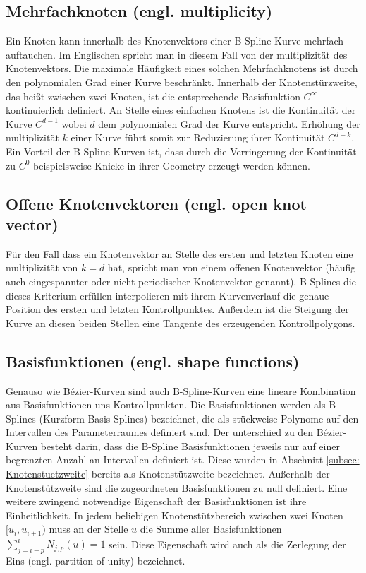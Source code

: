 \documentclass[german,a4paper,12pt,oneside]{scrbook}
\theoremstyle{definition}
\theoremstyle{definition}
\theoremstyle{definition}
\theoremstyle{definition}
\theoremstyle{definition}
\theoremstyle{definition}
\begin{document}
\subsection{Mehrfachknoten (engl. multiplicity)}
Ein Knoten kann innerhalb des Knotenvektors einer B-Spline-Kurve mehrfach auftauchen. Im Englischen spricht man in diesem Fall von der multiplizität des Knotenvektors. Die maximale Häufigkeit eines solchen Mehrfachknotens ist durch den polynomialen Grad einer Kurve beschränkt. Innerhalb der Knotenstürzweite, das heißt zwischen zwei Knoten, ist die entsprechende Basisfunktion $C^{\infty}$ kontinuierlich definiert. An Stelle eines einfachen Knotens ist die Kontinuität der Kurve $C^{d-1}$ wobei $d$ dem polynomialen Grad der Kurve entspricht. Erhöhung der multiplizität $k$ einer Kurve führt somit zur Reduzierung ihrer Kontinuität $C^{d-k}$. Ein Vorteil der B-Spline Kurven ist, dass durch die Verringerung der Kontinuität zu $C^{0}$ beispielsweise Knicke in ihrer Geometry erzeugt werden können.

\subsection{Offene Knotenvektoren (engl. open knot vector)}
Für den Fall dass ein Knotenvektor an Stelle des ersten und letzten Knoten eine multiplizität von $k = d$ hat, spricht man von einem offenen Knotenvektor (häufig auch eingespannter oder nicht-periodischer Knotenvektor genannt). B-Splines die dieses Kriterium erfüllen interpolieren mit ihrem Kurvenverlauf die genaue Position des ersten und letzten Kontrollpunktes. Außerdem ist die Steigung der Kurve an diesen beiden Stellen eine Tangente des erzeugenden Kontrollpolygons.

\subsection{Basisfunktionen (engl. shape functions)}
Genauso wie Bézier-Kurven sind auch B-Spline-Kurven eine lineare Kombination aus Basisfunktionen uns Kontrollpunkten. Die Basisfunktionen werden als B-Splines (Kurzform Basis-Splines) bezeichnet, die als stückweise Polynome auf den Intervallen des Parameterraumes definiert sind. Der unterschied zu den Bézier-Kurven besteht darin, dass die B-Spline Basisfunktionen jeweils nur auf einer begrenzten Anzahl an Intervallen definiert ist. Diese wurden in Abschnitt \ref{subsec: Knotenstuetzweite} bereits als Knotenstützweite bezeichnet. Außerhalb der Knotenstützweite sind die zugeordneten Basisfunktionen zu null definiert. 
Eine weitere zwingend notwendige Eigenschaft der Basisfunktionen ist ihre Einheitlichkeit. In jedem beliebigen Knotenstützbereich zwischen zwei Knoten $[u_i, u_{i+1})$ muss an der Stelle $u$ die Summe aller Basisfunktionen $\sum^{i}_{j=i-p} {N_{j,p}(u)} = 1$ sein. Diese Eigenschaft wird auch als die Zerlegung der Eins (engl. partition of unity) bezeichnet. 
\end{document}

